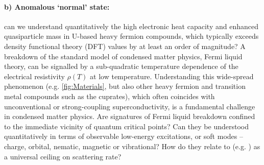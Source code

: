 \paragraph{b) Anomalous `normal' state:} %
can we understand quantitatively the high electronic heat capacity and enhanced quasiparticle mass in U-based heavy fermion compounds, which typically exceeds density functional theory (DFT) values by at least an order of magnitude? A breakdown of the standard model of condensed matter physics, Fermi liquid theory, can be signalled by a sub-quadratic temperature dependence of the electrical resistivity $\rho(T)$ at low temperature. 
Understanding this wide-spread phenomenon  (e.g. \autoref{fig:Materials}, but also other heavy fermion and transition metal compounds such as the cuprates), which often coincides with unconventional or strong-coupling superconductivity, is a fundamental challenge in condensed matter physics. 
Are signatures of Fermi liquid breakdown confined to the immediate vicinity of quantum critical points?
Can they be understood quantitatively in terms of observable low-energy excitations, or soft modes -- charge, orbital, nematic, magnetic or vibrational? How do they relate to  (e.g. \cite{bruin13,hartnoll15}) as a universal ceiling on scattering rate? 

